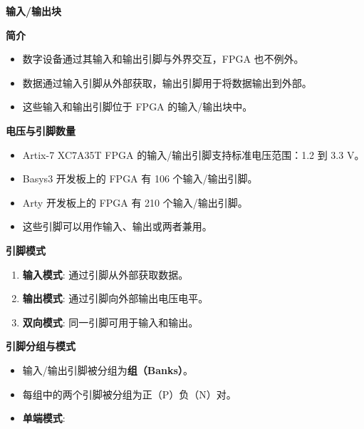 \documentclass[
  ignorenonframetext,
  chinese,
]{beamer}
\providecommand{\tightlist}{%
  \setlength{\itemsep}{0pt}\setlength{\parskip}{0pt}}
\begin{document}
\begin{frame}
\begin{block}{\textbf{输入/输出块}}
\label{ux8f93ux5165ux8f93ux51faux5757}
\begin{block}{\textbf{简介}}
\label{ux7b80ux4ecb}
\begin{itemize}
\tightlist
\item
  数字设备通过其输入和输出引脚与外界交互，FPGA 也不例外。
\item
  数据通过输入引脚从外部获取，输出引脚用于将数据输出到外部。
\item
  这些输入和输出引脚位于 FPGA 的输入/输出块中。
\end{itemize}
\end{block}

\begin{block}{\textbf{电压与引脚数量}}
\label{ux7535ux538bux4e0eux5f15ux811aux6570ux91cf}
\begin{itemize}
\tightlist
\item
  Artix-7 XC7A35T FPGA 的输入/输出引脚支持标准电压范围：1.2 到 3.3 V。
\item
  Basys3 开发板上的 FPGA 有 106 个输入/输出引脚。
\item
  Arty 开发板上的 FPGA 有 210 个输入/输出引脚。
\item
  这些引脚可以用作输入、输出或两者兼用。
\end{itemize}
\end{block}

\begin{block}{\textbf{引脚模式}}
\label{ux5f15ux811aux6a21ux5f0f}
\begin{enumerate}
\tightlist
\item
  \textbf{输入模式}: 通过引脚从外部获取数据。
\item
  \textbf{输出模式}: 通过引脚向外部输出电压电平。
\item
  \textbf{双向模式}: 同一引脚可用于输入和输出。
\end{enumerate}
\end{block}

\begin{block}{\textbf{引脚分组与模式}}
\label{ux5f15ux811aux5206ux7ec4ux4e0eux6a21ux5f0f}
\begin{itemize}
\tightlist
\item
  输入/输出引脚被分组为\textbf{组（Banks）}。
\item
  每组中的两个引脚被分组为正（P）负（N）对。
\item
  \textbf{单端模式}:


\end{itemize}
\end{block}
\end{block}
\end{frame}
\end{document}
